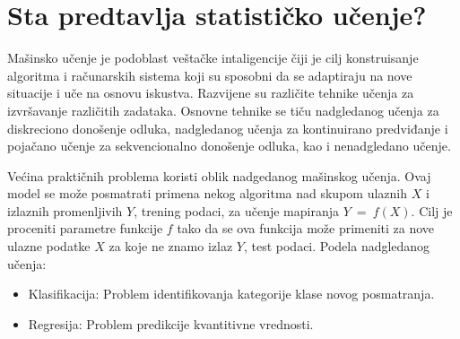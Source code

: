 
\ifpdf
    \graphicspath{{Chapter1/Figs/Raster/}{Chapter1/Figs/PDF/}{Chapter1/Figs/}}
\else
    \graphicspath{{Chapter1/Figs/Vector/}{Chapter1/Figs/}}
\fi


\section{Sta predtavlja statističko učenje?}

Mašinsko učenje je podoblast veštačke intaligencije čiji je cilj konstruisanje
algoritma i računarskih sistema koji su sposobni da se adaptiraju na nove
situacije i uče na osnovu iskustva. Razvijene su različite tehnike učenja za
izvršavanje različitih zadataka. Osnovne tehnike se tiču nadgledanog učenja za
diskreciono donošenje odluka, nadgledanog učenja za kontinuirano predviđanje i
pojačano učenje za sekvencionalno donošenje odluka, kao i nenadgledano učenje.


Većina praktičnih problema koristi oblik nadgedanog mašinskog učenja.
Ovaj model se može posmatrati primena nekog algoritma nad skupom ulaznih $X$ i
izlaznih promenljivih $Y$, trening podaci, za učenje mapiranja $Y \ = \ f(X)$.
Cilj je proceniti parametre funkcije $f$ tako da se ova funkcija može primeniti
za nove ulazne podatke $X$ za koje ne znamo izlaz $Y$, test podaci. Podela
nadgledanog učenja:
\begin{itemize}
  \item Klasifikacija: Problem identifikovanja kategorije klase novog
  posmatranja.
  \item Regresija: Problem predikcije kvantitivne vrednosti.
\end{itemize}

